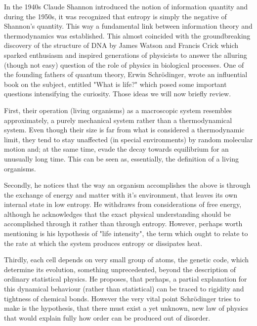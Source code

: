 \documentclass[a4paper,12pt]{article}
\begin{document}
In the 1940s Claude Shannon introduced the notion of information quantity \cite{Shannon:429164} and during the 1950s, it was recognized that entropy is simply the negative of Shannon's quantity. This way a fundamental link between information theory and thermodynamics was established. This almost coincided with the groundbreaking discovery of the structure of DNA by James Watson and Francis Crick which sparked enthusiasm and inspired generations of physicists to answer the alluring (though not easy) question of the role of physics in biological processes.
One of the founding fathers of quantum theory, Erwin Schrödinger, wrote an influential book on the subject, entitled "What is life?" \cite{Schrodinger:2005wk} which  posed some important questions intensifying the curiosity. Those ideas we will now briefly review.


First, their operation (living organisms) as a macroscopic system resembles approximately, a purely mechanical system rather than a thermodynamical system. 
Even though their size is far from what is considered a thermodynamic limit, they tend to stay unaffected (in special environments) by random molecular motion and; at the same time, evade the decay towards equilibrium for an unusually long time. This can be seen as, essentially, the definition of a living organisms.

Secondly, he notices that the way an organism accomplishes the above is through the exchange of energy and matter with it's environment, that leaves its own internal state in low entropy. He withdraws from considerations of free energy, although he acknowledges that the exact physical understanding should be accomplished through it rather than through entropy. However, perhaps worth mentioning is his hypothesis of "life intensity", the term which ought to relate to the rate at which the system produces entropy or dissipates heat.

Thirdly, each cell depends on very small group of atoms, the genetic code, which determine its evolution, something unprecedented, beyond the description of ordinary statistical physics. He proposes, that perhaps, a partial explanation for this dynamical behaviour (rather than statistical) can be traced to rigidity and tightness of chemical bonds. However the very vital point Schrödinger tries to make is the hypothesis, that there must exist a yet unknown, new law of physics that would explain fully how order can be produced out of disorder. 
\end{document}
